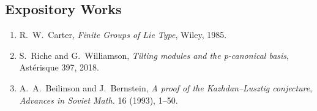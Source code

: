 \subsection*{Expository Works}
\begin{enumerate}
    \item R.\ W.\ Carter, \textit{Finite Groups of Lie Type}, Wiley, 1985.
    \item S.\ Riche and G.\ Williamson, \textit{Tilting modules and the p-canonical basis}, Ast\'erisque 397, 2018.
    \item A.\ A.\ Beilinson and J.\ Bernstein, \textit{A proof of the Kazhdan--Lusztig conjecture}, \textit{Advances in Soviet Math.} 16 (1993), 1--50.
\end{enumerate}

